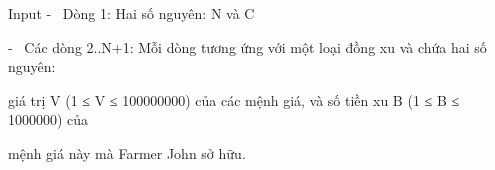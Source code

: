Input
-  Dòng 1: Hai số nguyên: N và C  

   -  Các dòng 2..N+1: Mỗi dòng tương ứng với một loại đồng xu và chứa hai số nguyên:  

   giá trị V (1 ≤ V ≤ 100000000) của các mệnh giá, và số tiền xu B (1 ≤ B ≤ 1000000) của  

   mệnh giá này mà Farmer John sở hữu.